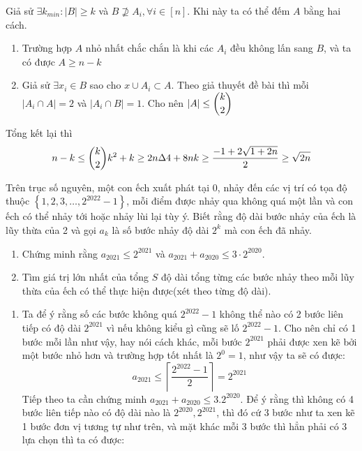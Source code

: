 \documentclass[11pt]{scrartcl}
\begin{document}
\begin{itemize}[label=, leftmargin=0em, itemsep=0.5em]
\begin{sol}
        Giả sử $\exists k_{min}: |B| \geq k$ và $B \nsupseteq A_i, \forall i \in [n]$. Khi này ta có thể đếm $A$ bằng hai cách.
        \begin{enumerate}
            \item  {} Trường hợp $A$ nhỏ nhất chắc chắn là khi các $A_i$ đều không lấn sang $B$, và ta có được $A \geq n - k $ 
            \item {}Giả sử $\exists x_i \in B$ sao cho $x \cup A_i \subset A$. Theo giả thuyết đề bài thì mỗi $|A_i \cap A| = 2$ và $|A_i \cap B| = 1$. Cho nên $|A| \leq \dbinom{k}{2}$
        \end{enumerate}
        Tổng kết lại thì $$n - k \leq \dbinom{k}{2} \Leftrightarrow  k^2 + k \geq 2n \Rightarrow \Delta \lra 4 + 8n \Rightarrow k \geq \frac{-1 + 2\sqrt{1 + 2n}}{2} \geq \sqrt{2n}$$
    \end{sol}
    \begin{bt}
        Trên trục số nguyên, một con ếch xuất phát tại 0, nhảy đến các vị trí có tọa độ thuộc $\left\{1,2,3, \ldots, 2^{2022}-1\right\}$, mỗi điểm được nhảy qua không quá một lần và con ếch có thể nhảy tới hoặc nhảy lùi lại tùy ý. Biết rằng độ dài bước nhảy của ếch là lũy thừa của 2 và gọi $a_k$ là số bước nhảy độ dài $2^k$ mà con ếch đã nhảy.
    \begin{enumerate}[label=(\alph*)]
        \item Chứng minh rằng $a_{2021} \leq 2^{2021}$ và $a_{2021}+a_{2020} \leq 3 \cdot 2^{2020}$.
        \item Tìm giá trị lớn nhất của tổng $S$ độ dài tổng từng các bước nhảy theo mỗi lũy thừa của ếch có thể thực hiện được(xét theo từng độ dài).
    \end{enumerate}
    \end{bt}
    \begin{sol}
        \begin{enumerate}
            \item Ta để ý rằng số các bước không quá $2^{2022} -1 $ không thể nào có 2 bước liên tiếp có độ dài $2^{2021}$ vì nếu không kiểu gì cũng sẽ lố $2^{2022} - 1$. Cho nên chỉ có 1 bước mỗi lần như vậy, hay nói cách khác, mỗi bước $2^{2021}$ phải được xen kẽ bởi một bước nhỏ hơn và trường hợp tốt nhất là $2^0 = 1$, như vậy ta sẽ có được:
            $$
            a_{2021} \leq \left\lceil \frac{2^{2022} - 1}{2}\right\rceil   = 2^{2021}
            $$
            Tiếp theo ta cần chứng minh $a_{2021} + a_{2020} \leq 3.2^{2020}$. Để ý rằng thì không có 4 bước liên tiếp nào có độ dài nào là $2^{2020},2^{2021}$, thì đó cứ 3 bước như ta xen kẽ 1 bước đơn vị tương tự như trên, và mặt khác mỗi 3 bước thì hẳn phải có 3 lựa chọn thì ta có được:

\end{enumerate}
\end{sol}
\end{itemize}
\end{document}
